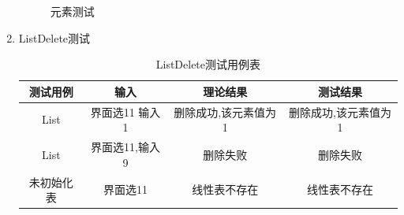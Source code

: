 \documentclass[supercite]{HustGraduPaper}
\theoremstyle{definition}
\begin{document}
\begin{enumerate}
\begin{figure}[htb]
		      \caption{元素测试}
	      \end{figure}
	      \newpage
	\item ListDelete测试
	      \begin{table}[htb]
		      \begin{center}
			      \setlength{\tabcolsep}{2.0mm}
			      \caption{ListDelete测试用例表}
			      \label{table10}
			      \begin{tabular}{|c|c|c|c|}
				      \hline
				      测试用例   & 输入           & 理论结果             & 测试结果             \\
				      \hline
				      \hline
				      List       & 界面选11 输入1 & 删除成功,该元素值为1 & 删除成功,该元素值为1 \\
				      \hline
				      List       & 界面选11,输入9 & 删除失败             & 删除失败             \\
				      \hline
				      未初始化表 & 界面选11       & 线性表不存在         & 线性表不存在         \\
				      \hline
			      \end{tabular}
		      \end{center}
	      \end{table}
	      \begin{figure}[htb]
		      \centering
		      \quad
		      \\

\end{figure}
\end{enumerate}
\end{document}
